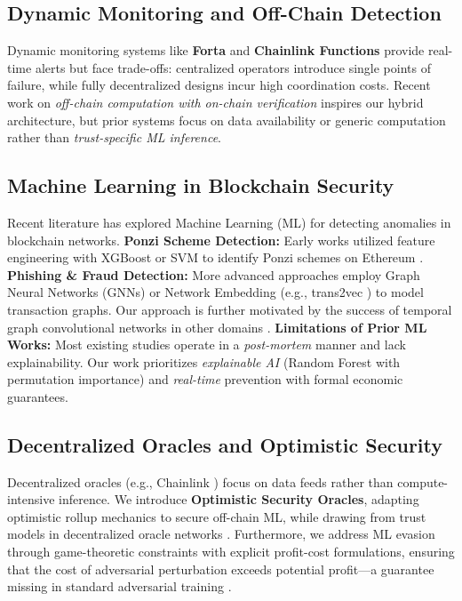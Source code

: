 \documentclass[runningheads]{llncs}
\begin{document}
\subsection{Dynamic Monitoring and Off-Chain Detection}
Dynamic monitoring systems like \textbf{Forta} \cite{forta2021} and \textbf{Chainlink Functions} provide real-time alerts but face trade-offs: centralized operators introduce single points of failure, while fully decentralized designs incur high coordination costs. Recent work on \textit{off-chain computation with on-chain verification} \cite{kalodner2018arbitrum, breidenbach2021chainlink} inspires our hybrid architecture, but prior systems focus on data availability or generic computation rather than \textit{trust-specific ML inference}.

\subsection{Machine Learning in Blockchain Security}
Recent literature has explored Machine Learning (ML) for detecting anomalies in blockchain networks. 
\textbf{Ponzi Scheme Detection:} Early works utilized feature engineering with XGBoost \cite{chen2016xgboost} or SVM to identify Ponzi schemes on Ethereum \cite{chen2018detecting,nikolic2018finding}.
\textbf{Phishing \& Fraud Detection:} More advanced approaches employ Graph Neural Networks (GNNs) \cite{wu2020comprehensive} or Network Embedding (e.g., trans2vec \cite{wu2020phishers}) to model transaction graphs. Our approach is further motivated by the success of temporal graph convolutional networks in other domains \cite{zhao2019t}.
\textbf{Limitations of Prior ML Works:} Most existing studies operate in a \textit{post-mortem} manner and lack explainability. Our work prioritizes \textit{explainable AI} (Random Forest \cite{breiman2001random} with permutation importance) and \textit{real-time} prevention with formal economic guarantees.

\subsection{Decentralized Oracles and Optimistic Security}
Decentralized oracles (e.g., Chainlink \cite{ellis2017chainlink}) focus on data feeds rather than compute-intensive inference. We introduce \textbf{Optimistic Security Oracles}, adapting optimistic rollup mechanics \cite{kalodner2018arbitrum} to secure off-chain ML, while drawing from trust models in decentralized oracle networks \cite{al2020trustworthy}. Furthermore, we address ML evasion through game-theoretic constraints with explicit profit-cost formulations, ensuring that the cost of adversarial perturbation exceeds potential profit—a guarantee missing in standard adversarial training \cite{yaish2024speculative,eskandari2019sok}.
\end{document}
